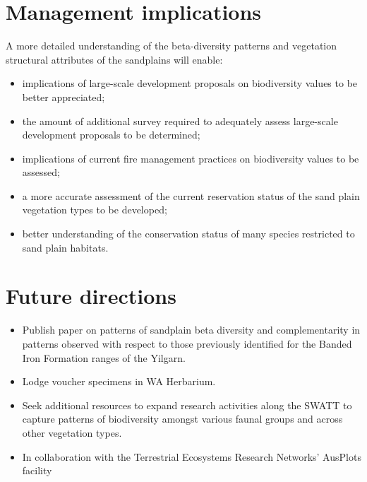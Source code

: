 \documentclass[version=last,
    paper=a4, %
    10pt, %
    usenames,
    dvipsnames,
    oneside, %
    headings=openany, %
    DIV=15 %
]{scrbook}
\begin{document}
\section*{Management implications}
A more detailed understanding of the beta-diversity patterns and
vegetation structural attributes of the sandplains will enable:

\begin{itemize}
\itemsep1pt\parskip0pt
\item
  implications of large-scale development proposals on biodiversity
  values to be better appreciated;
\item
  the amount of additional survey required to adequately assess
  large-scale development proposals to be determined;
\item
  implications of current fire management practices on biodiversity
  values to be assessed;
\item
  a more accurate assessment of the current reservation status of the
  sand plain vegetation types to be developed;
\item
  better understanding of the conservation status of many species
  restricted to sand plain habitats.
\end{itemize}



\section*{Future directions}
\begin{itemize}
\itemsep1pt\parskip0pt
\item
  Publish paper on patterns of sandplain beta diversity and
  complementarity in patterns observed with respect to those previously
  identified for the Banded Iron Formation ranges of the Yilgarn.
\item
  Lodge voucher specimens in WA Herbarium.
\item
  Seek additional resources to expand research activities along the
  SWATT to capture patterns of biodiversity amongst various faunal
  groups and across other vegetation types.
\item
  In collaboration with the Terrestrial Ecosystems Research Networks'
  AusPlots facility
\end{itemize}



\end{document}
